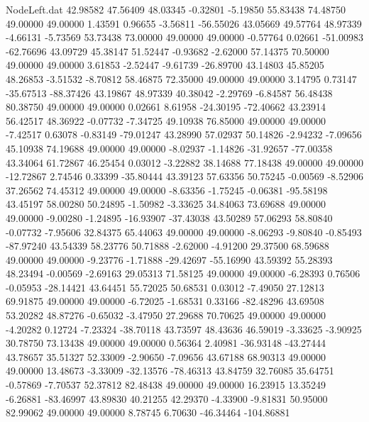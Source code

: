 \begin{filecontents}{NodeLeft.dat}
  42.98582   47.56409   48.03345    -0.32801   -5.19850   55.83438   74.48750   49.00000   49.00000    1.43591    0.96655   -3.56811  -56.55026
  43.05669   49.57764   48.97339    -4.66131   -5.73569   53.73438   73.00000   49.00000   49.00000   -0.57764    0.02661  -51.00983  -62.76696
  43.09729   45.38147   51.52447    -0.93682   -2.62000   57.14375   70.50000   49.00000   49.00000    3.61853   -2.52447   -9.61739  -26.89700
  43.14803   45.85205   48.26853    -3.51532   -8.70812   58.46875   72.35000   49.00000   49.00000    3.14795    0.73147  -35.67513  -88.37426
  43.19867   48.97339   40.38042    -2.29769   -6.84587   56.48438   80.38750   49.00000   49.00000    0.02661    8.61958  -24.30195  -72.40662
  43.23914   56.42517   48.36922    -0.07732   -7.34725   49.10938   76.85000   49.00000   49.00000   -7.42517    0.63078   -0.83149  -79.01247
  43.28990   57.02937   50.14826    -2.94232   -7.09656   45.10938   74.19688   49.00000   49.00000   -8.02937   -1.14826  -31.92657  -77.00358
  43.34064   61.72867   46.25454     0.03012   -3.22882   38.14688   77.18438   49.00000   49.00000  -12.72867    2.74546    0.33399  -35.80444
  43.39123   57.63356   50.75245    -0.00569   -8.52906   37.26562   74.45312   49.00000   49.00000   -8.63356   -1.75245   -0.06381  -95.58198
  43.45197   58.00280   50.24895    -1.50982   -3.33625   34.84063   73.69688   49.00000   49.00000   -9.00280   -1.24895  -16.93907  -37.43038
  43.50289   57.06293   58.80840    -0.07732   -7.95606   32.84375   65.44063   49.00000   49.00000   -8.06293   -9.80840   -0.85493  -87.97240
  43.54339   58.23776   50.71888    -2.62000   -4.91200   29.37500   68.59688   49.00000   49.00000   -9.23776   -1.71888  -29.42697  -55.16990
  43.59392   55.28393   48.23494    -0.00569   -2.69163   29.05313   71.58125   49.00000   49.00000   -6.28393    0.76506   -0.05953  -28.14421
  43.64451   55.72025   50.68531     0.03012   -7.49050   27.12813   69.91875   49.00000   49.00000   -6.72025   -1.68531    0.33166  -82.48296
  43.69508   53.20282   48.87276    -0.65032   -3.47950   27.29688   70.70625   49.00000   49.00000   -4.20282    0.12724   -7.23324  -38.70118
  43.73597   48.43636   46.59019    -3.33625   -3.90925   30.78750   73.13438   49.00000   49.00000    0.56364    2.40981  -36.93148  -43.27444
  43.78657   35.51327   52.33009    -2.90650   -7.09656   43.67188   68.90313   49.00000   49.00000   13.48673   -3.33009  -32.13576  -78.46313
  43.84759   32.76085   35.64751    -0.57869   -7.70537   52.37812   82.48438   49.00000   49.00000   16.23915   13.35249   -6.26881  -83.46997
  43.89830   40.21255   42.29370    -4.33900   -9.81831   50.95000   82.99062   49.00000   49.00000    8.78745    6.70630  -46.34464 -104.86881

\end{filecontents}
